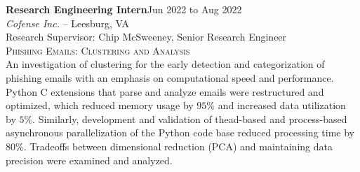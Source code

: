 \documentclass[hidelinks, 10pt]{article}
\begin{document}
{{    \vspace{4mm}

    \begin{minipage}[ct]{0.9\linewidth}
        \textbf{Research Engineering Intern}\hfill Jun 2022 to Aug 2022\\
        \emph{Cofense Inc.} -- Leesburg, VA\\
        Research Supervisor: Chip McSweeney, Senior Research Engineer\\
        {\textsc{Phishing Emails: Clustering and Analysis}}
        \vspace{1mm}\\
        An investigation of clustering for the early detection and categorization of
        phishing emails with an emphasis on computational speed and performance.  Python
        C extensions that parse and analyze emails were restructured and optimized,
        which reduced memory usage by $95$\% and increased data utilization by $5$\%.
        Similarly, development and validation of thead-based and process-based
        asynchronous parallelization of the Python code base reduced processing time by
        $80$\%. Tradeoffs between dimensional reduction (PCA) and maintaining data
        precision were examined and analyzed.
    \end{minipage}

    \vspace{4mm}

}}
\end{document}
